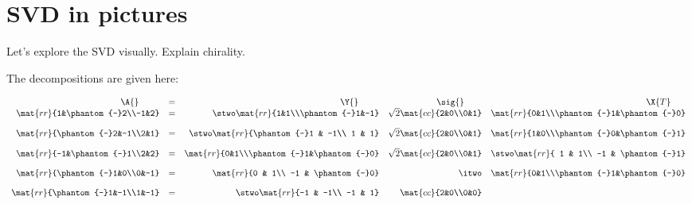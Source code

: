 \section{SVD in pictures}
Let's explore the SVD visually.
Explain chirality.

The decompositions are given here:
\clearpage
\thispagestyle{empty}
\begin{landscape}

\begin{equation}
  \begin{array}{rcrrr}
    \A{}\ \ \ \ \ \ \  &=& \Y{}\ \ \ \ \ \ \  & \sig{}\ \ \ \ \ \ & \X{T}\ \ \ \ \ \\
    \mat{rr}{1&\phantom{-}2\\-1&2} &=
    & \stwo \mat{rr}{1&1\\\phantom{-}1&-1}
    & \sqrt{2}\mat{cc}{2&0\\0&1}
    & \mat{rr}{0&1\\\phantom{-}1&\phantom{-}0}
\\[10pt]
    \mat{rr}{\phantom{-}2&-1\\2&1} &=
    & \stwo
      \mat{rr}{\phantom{-}1 & -1\\
               1 &  1}
    & \sqrt{2}\mat{cc}{2&0\\0&1}
    & \mat{rr}{1&0\\\phantom{-}0&\phantom{-}1}
\\[10pt]
    \mat{rr}{-1&\phantom{-}1\\2&2} &=
    & \mat{rr}{0&1\\\phantom{-}1&\phantom{-}0}
    & \sqrt{2}\mat{cc}{2&0\\0&1}
    & \stwo
      \mat{rr}{ 1 & 1\\
               -1 & \phantom{-}1}
\\[10pt]
    \mat{rr}{\phantom{-}1&0\\0&-1} &=
    & \mat{rr}{0 & 1\\
              -1 & \phantom{-}0}
    & \itwo
    & \mat{rr}{0&1\\\phantom{-}1&\phantom{-}0}
\\[10pt]
    \mat{rr}{\phantom{-}1&-1\\1&-1} &=
    & \stwo
      \mat{rr}{-1 & -1\\
               -1 &  1}
    & \mat{cc}{2&0\\0&0}

\end{array}
\end{equation}
\end{landscape}
